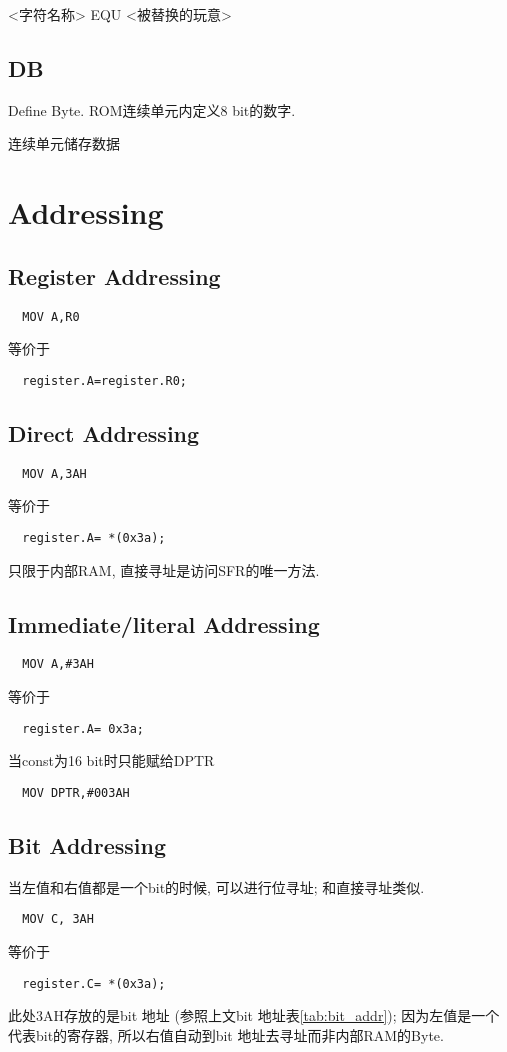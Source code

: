 \documentclass[a4paper]{report}
\begin{document}
<字符名称> EQU <被替换的玩意>
\subsection{DB}
Define Byte. ROM连续单元内定义8 bit的数字. 

连续单元储存数据
\section{Addressing}
\subsection{Register Addressing}
\begin{verbatim}
  MOV A,R0
\end{verbatim}
等价于
\begin{verbatim}
  register.A=register.R0;
\end{verbatim}



\subsection{Direct Addressing}
\begin{verbatim}
  MOV A,3AH
\end{verbatim}
等价于
\begin{verbatim}
  register.A= *(0x3a);
\end{verbatim}

只限于内部RAM, 直接寻址是访问SFR的唯一方法. 
\subsection{Immediate/literal Addressing}
\begin{verbatim}
  MOV A,#3AH
\end{verbatim}
等价于
\begin{verbatim}
  register.A= 0x3a;
\end{verbatim}
当const为16 bit时只能赋给DPTR
\begin{verbatim}
  MOV DPTR,#003AH
\end{verbatim}
\subsection{Bit Addressing}
当左值和右值都是一个bit的时候, 可以进行位寻址; 和直接寻址类似. 
\begin{verbatim}
  MOV C, 3AH
\end{verbatim}
等价于
\begin{verbatim}
  register.C= *(0x3a);
\end{verbatim}
此处3AH存放的是bit 地址 (参照上文bit 地址表\ref{tab:bit_addr}); 因为左值是一个代表bit的寄存器, 所以右值自动到bit 地址去寻址而非内部RAM的Byte. 
\end{document}
